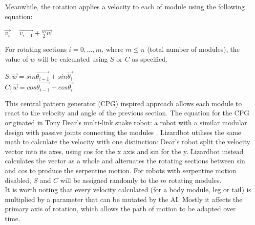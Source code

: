 \documentclass{article}
\begin{document}
Meanwhile, the rotation applies a velocity to each of module using the following equation:
\begin{center}
\begin{Large}
$\overrightarrow{v_{i}} = \overrightarrow{v_{i-1}} + \frac{m}{2}\overrightarrow{w} $
\end{Large}
\end{center}

For rotating sections $i = 0, ..., m$, where $m \leq n$ (total number of modules), the value of $w$ will be calculated using $S$ or $C$ as specified.\\
\begin{center}
\begin{Large}
$S: \overrightarrow{w} = sin\overrightarrow{\theta_{i-1}} + sin\overrightarrow{\theta_{i}}$
\\[1\baselineskip]
$C: \overrightarrow{w} = cos\overrightarrow{\theta_{i-1}} + cos\overrightarrow{\theta_{i}}$\\
\end{Large}
\end{center}

This central pattern generator (CPG) inspired approach allows each module to react to the velocity and angle of the previous section. The equation for the CPG originated in Tony Dear’s multi-link snake robot: a robot with a similar modular design with passive joints connecting the modules . Lizardbot utilises the same math to calculate the velocity with one distinction: Dear’s robot split the velocity vector into its axes, using cos for the x axis and sin for the y. Lizardbot instead calculates the vector as a whole and alternates the rotating sections between sin and cos to produce the serpentine motion. For robots with serpentine motion disabled, $S$ and $C$ will be assigned randomly to the $m$ rotating modules.\\

It is worth noting that every velocity calculated (for a body module, leg or tail) is multiplied by a parameter that can be mutated by the AI. Mostly it affects the primary axis of rotation, which allows the path of motion to be adapted over time.
\end{document}
